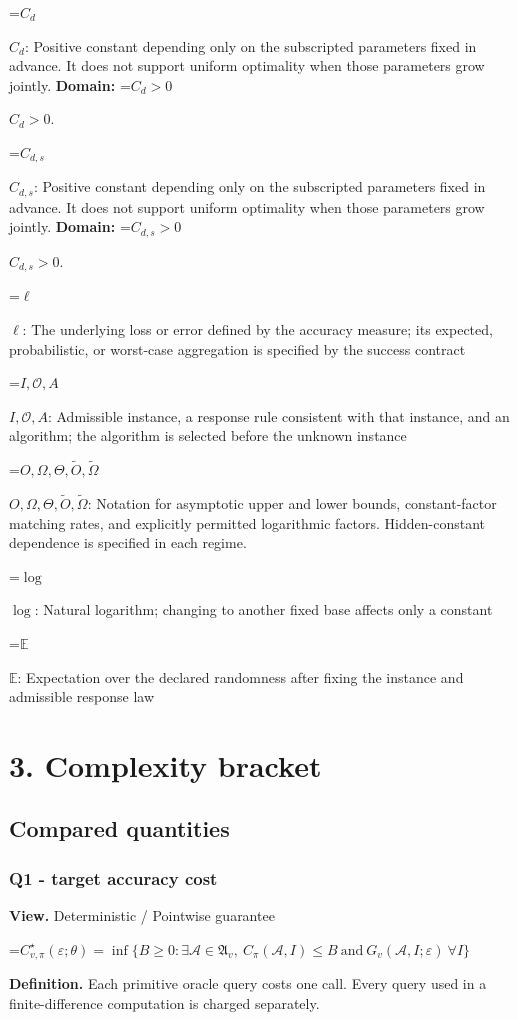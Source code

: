 \documentclass[10pt,a4paper]{article}
\newcommand{\AtlasMath}[1]{\par\begingroup\centering\setbox0=\hbox{$\displaystyle #1$}\ifdim\wd0>1.4\linewidth\typeout{ATLAS WIDE FORMULA: \the\wd0}\fi\ifdim\wd0>\linewidth\resizebox{\linewidth}{!}{\box0}\else\box0\fi\par\endgroup}
\newcommand{\AtlasInlineMath}[1]{\begingroup\setbox0=\hbox{$#1$}\ifdim\wd0>.4\linewidth\endgroup\AtlasMath{#1}\else\endgroup$#1$\fi}
\begin{document}
\AtlasInlineMath{C_d}: Positive constant depending only on the subscripted parameters fixed in advance. It does not support uniform optimality when those parameters grow jointly. \textbf{Domain:} \AtlasInlineMath{C_d>0}.

\AtlasInlineMath{C_{d,s}}: Positive constant depending only on the subscripted parameters fixed in advance. It does not support uniform optimality when those parameters grow jointly. \textbf{Domain:} \AtlasInlineMath{C_{d,s}>0}.

\AtlasInlineMath{\ell}: The underlying loss or error defined by the accuracy measure; its expected, probabilistic, or worst-case aggregation is specified by the success contract

\AtlasInlineMath{I,\mathcal{O},A}: Admissible instance, a response rule consistent with that instance, and an algorithm; the algorithm is selected before the unknown instance

\AtlasInlineMath{O,\Omega,\Theta,\widetilde{O},\widetilde\Omega}: Notation for asymptotic upper and lower bounds, constant-factor matching rates, and explicitly permitted logarithmic factors. Hidden-constant dependence is specified in each regime.

\AtlasInlineMath{\log}: Natural logarithm; changing to another fixed base affects only a constant

\AtlasInlineMath{\mathbb{E}}: Expectation over the declared randomness after fixing the instance and admissible response law

\section{3. Complexity bracket}
\subsection{Compared quantities}
\subsubsection{Q1 - target accuracy cost}
\textbf{View.} Deterministic / Pointwise guarantee

\AtlasMath{C^\star_{v,\pi}(\varepsilon;\theta)=\inf\{B\ge0:\exists\mathcal A\in\mathfrak A_v,\ C_\pi(\mathcal A,I)\le B\ \text{and}\ G_v(\mathcal A,I;\varepsilon)\ \forall I\}}
\textbf{Definition.} Each primitive oracle query costs one call. Every query used in a finite-difference computation is charged separately.
\end{document}
